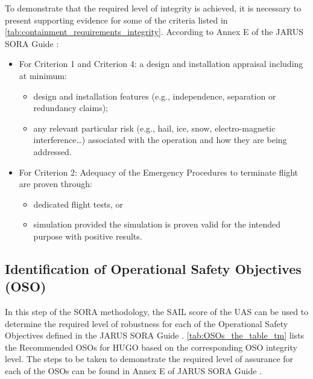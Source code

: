 To demonstrate that the required level of integrity is achieved, it is necessary to present supporting evidence for some of the criteria listed in \autoref{tab:containment_requirements_integrity}. According to Annex E of the JARUS SORA Guide \cite{Jarus_Annex_E}:

\begin{itemize}
\item {For Criterion 1 and Criterion 4: a design and installation appraisal including at minimum:
\begin{itemize}
    \item design and installation features (e.g., independence, separation
or redundancy claims);
    \item any relevant particular risk (e.g., hail, ice, snow, electro-magnetic interference…) associated with the operation and how they are
being addressed.
\end{itemize}}
\item {For Criterion 2: Adequacy of the Emergency Procedures to terminate flight are proven through:
\begin{itemize}
    \item dedicated flight tests, or
    \item simulation provided the simulation is proven valid for the intended purpose with positive results.
\end{itemize}}
\end{itemize}




\subsection{Identification of Operational Safety Objectives (OSO)}
In this step of the SORA methodology, the SAIL score of the UAS can be used to determine the required level of robustness for each of the Operational Safety Objectives defined in the JARUS SORA Guide \cite{Jarus_main}. \autoref{tab:OSOs_the_table_tm} lists the Recommended OSOs for HUGO based on the corresponding OSO integrity level. The steps to be taken to demonstrate the required level of assurance for each of the OSOs can be found in Annex E of JARUS SORA Guide \cite{Jarus_Annex_E}.


